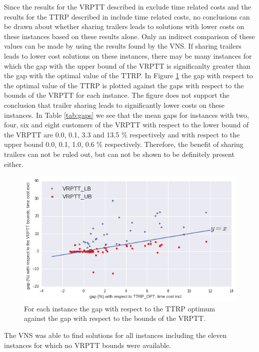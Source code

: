 Since the results for the VRPTT described in \cite{drexl2014bandc} exclude time related costs and the results for the TTRP described in \cite{drexl2011branch} include time related costs, no conclusions can be drawn about whether sharing trailers leads to solutions with lower costs on these instances based on these results alone.
Only an indirect comparison of these values can be made by using the results found by the VNS.
If sharing trailers leads  to lower cost solutions on these instances,  there may be many instances for which the gap with the upper bound of the VRPTT is significanlty greater than the gap with the optimal value of the TTRP.
In Figure  \ref{fig:gapvsgap} the gap with respect to the optimal value of the TTRP is  plotted against the gaps with respect to the bounds of the VRPTT for each instance.
The figure does not support the conclusion that trailer sharing leads to significantly lower costs on these instances.
In Table \ref{tab:gaps} we see that the mean gaps for instances with two, four, six and eight customers of the VRPTT with respect to the lower bound of the VRPTT  are 0.0, 0.1, 3.3 and 13.5 \% respectively and with respect to the upper bound 0.0, 0.1, 1.0, 0.6 \% respectively.
Therefore, the benefit of sharing trailers can not be ruled out, but can not be shown to be definitely present either.

\begin{figure}[!ht]
  \centering
    \includegraphics[width=1.0\textwidth]{img/gapvsgap.png}
  \caption{For each instance the gap with respect to the TTRP optimum against the gap with respect to the bounds of the VRPTT. }
  \label{fig:gapvsgap}
\end{figure}


The VNS was able to find solutions for all instances including the eleven instances for which no VRPTT bounds were available.


